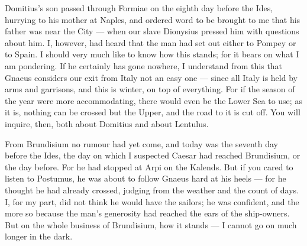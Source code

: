 

 Domitius's son passed through Formiae on the eighth day before the Ides, hurrying to his mother at Naples, and ordered word to be brought to me that his father was near the City --- when our slave Dionysius pressed him with questions about him. I, however, had heard that the man had set out either to Pompey or to Spain. I should very much like to know how this stands; for it bears on what I am pondering. If he certainly has gone nowhere, I understand from this that Gnaeus considers our exit from Italy not an easy one --- since all Italy is held by arms and garrisons, and this is winter, on top of everything. For if the season of the year were more accommodating, there would even be the Lower Sea to use; as it is, nothing can be crossed but the Upper, and the road to it is cut off. You will inquire, then, both about Domitius and about Lentulus.

 From Brundisium no rumour had yet come, and today was the seventh day before the Ides, the day on which I suspected Caesar had reached Brundisium, or the day before. For he had stopped at Arpi on the Kalends. But if you cared to listen to Postumus, he was about to follow Gnaeus hard at his heels --- for he thought he had already crossed, judging from the weather and the count of days. I, for my part, did not think he would have the sailors; he was confident, and the more so because the man's generosity had reached the ears of the ship-owners. But on the whole business of Brundisium, how it stands --- I cannot go on much longer in the dark.
